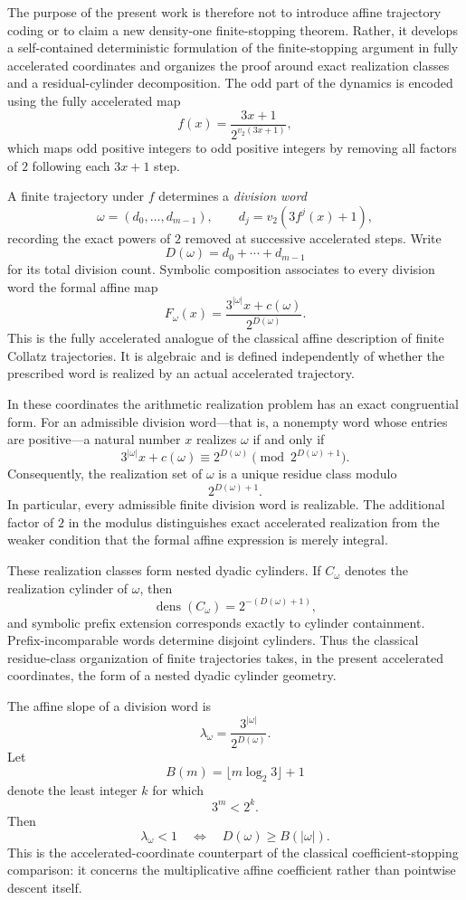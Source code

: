 \documentclass[12pt, oneside]{article}
\numberwithin{equation}{section}
\theoremstyle{definition}
\theoremstyle{plain}
\theoremstyle{remark}
\begin{document}
The purpose of the present work is therefore not to introduce affine
trajectory coding or to claim a new density-one finite-stopping theorem.
Rather, it develops a self-contained deterministic formulation of the
finite-stopping argument in fully accelerated coordinates and organizes the
proof around exact realization classes and a residual-cylinder
decomposition. The odd part of the dynamics is encoded using the fully
accelerated map
\[
f(x)
=
\frac{3x+1}{2^{v_2(3x+1)}},
\]
which maps odd positive integers to odd positive integers by removing all
factors of \(2\) following each \(3x+1\) step.

A finite trajectory under \(f\) determines a \emph{division word}
\[
\omega=(d_0,\dots,d_{m-1}),
\qquad
d_j=v_2\!\left(3f^j(x)+1\right),
\]
recording the exact powers of \(2\) removed at successive accelerated
steps. Write
\[
D(\omega)=d_0+\cdots+d_{m-1}
\]
for its total division count. Symbolic composition associates to every
division word the formal affine map
\[
F_\omega(x)
=
\frac{3^{|\omega|}x+c(\omega)}
     {2^{D(\omega)}}.
\]
This is the fully accelerated analogue of the classical affine description
of finite Collatz trajectories. It is algebraic and is defined independently
of whether the prescribed word is realized by an actual accelerated
trajectory.

In these coordinates the arithmetic realization problem has an exact
congruential form. For an admissible division word---that is, a nonempty
word whose entries are positive---a natural number \(x\) realizes
\(\omega\) if and only if
\[
3^{|\omega|}x+c(\omega)
\equiv
2^{D(\omega)}
\pmod{2^{D(\omega)+1}}.
\]
Consequently, the realization set of \(\omega\) is a unique residue class
modulo
\[
2^{D(\omega)+1}.
\]
In particular, every admissible finite division word is realizable. The
additional factor of \(2\) in the modulus distinguishes exact accelerated
realization from the weaker condition that the formal affine expression is
merely integral.

These realization classes form nested dyadic cylinders. If \(C_\omega\)
denotes the realization cylinder of \(\omega\), then
\[
\operatorname{dens}(C_\omega)
=
2^{-(D(\omega)+1)},
\]
and symbolic prefix extension corresponds exactly to cylinder containment.
Prefix-incomparable words determine disjoint cylinders. Thus the classical
residue-class organization of finite trajectories takes, in the present
accelerated coordinates, the form of a nested dyadic cylinder geometry.

The affine slope of a division word is
\[
\lambda_\omega
=
\frac{3^{|\omega|}}{2^{D(\omega)}}.
\]
Let
\[
B(m)
=
\lfloor m\log_2 3\rfloor+1
\]
denote the least integer \(k\) for which
\[
3^m<2^k.
\]
Then
\[
\lambda_\omega<1
\quad\Longleftrightarrow\quad
D(\omega)\ge B(|\omega|).
\]
This is the accelerated-coordinate counterpart of the classical
coefficient-stopping comparison: it concerns the multiplicative affine
coefficient rather than pointwise descent itself.
\end{document}
